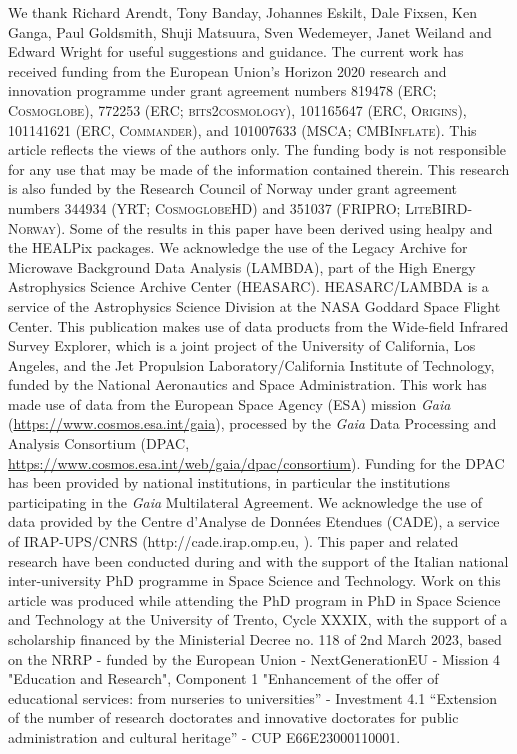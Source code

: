 \documentclass{aa}
\begin{document}
\begin{acknowledgements}
  We thank Richard Arendt, Tony Banday, Johannes Eskilt, Dale Fixsen, Ken Ganga, Paul
  Goldsmith, Shuji Matsuura, Sven Wedemeyer, Janet Weiland and Edward Wright for
  useful suggestions and guidance.  The current work has received
  funding from the European Union’s Horizon 2020 research and
  innovation programme under grant agreement numbers 819478 (ERC;
  \textsc{Cosmoglobe}), 772253 (ERC; \textsc{bits2cosmology}),
  101165647 (ERC, \textsc{Origins}), 101141621 (ERC,
  \textsc{Commander}), and 101007633 (MSCA; \textsc{CMBInflate}).
  This article reflects the views of the authors only. The funding
  body is not responsible for any use that may be made of the
  information contained therein. This research is
  also funded by the Research Council of Norway under grant agreement
  numbers 344934 (YRT; \textsc{CosmoglobeHD}) and 351037 (FRIPRO;
  \textsc{LiteBIRD-Norway}). Some of the results in this paper have been
  derived using healpy \citep{Zonca2019} and the HEALPix
  \citep{healpix} packages.  We acknowledge the use of the Legacy
  Archive for Microwave Background Data Analysis (LAMBDA), part of the
  High Energy Astrophysics Science Archive Center
  (HEASARC). HEASARC/LAMBDA is a service of the Astrophysics Science
  Division at the NASA Goddard Space Flight Center. This publication
  makes use of data products from the Wide-field Infrared Survey
  Explorer, which is a joint project of the University of California,
  Los Angeles, and the Jet Propulsion Laboratory/California Institute
  of Technology, funded by the National Aeronautics and Space
  Administration. This work has made use of data from the European
  Space Agency (ESA) mission {\it Gaia}
  (\url{https://www.cosmos.esa.int/gaia}), processed by the {\it Gaia}
  Data Processing and Analysis Consortium (DPAC,
  \url{https://www.cosmos.esa.int/web/gaia/dpac/consortium}). Funding
  for the DPAC has been provided by national institutions, in
  particular the institutions participating in the {\it Gaia}
  Multilateral Agreement.  We acknowledge the use of data provided by
  the Centre d'Analyse de Données Etendues (CADE), a service of
  IRAP-UPS/CNRS (http://cade.irap.omp.eu, \citealt{paradis:2012}).  
  This paper and related research have been conducted during and with the support of the Italian national inter-university PhD programme in Space Science and Technology. Work on this article was produced while attending the PhD program in PhD in Space Science and Technology at the University of Trento, Cycle XXXIX, with the support of a scholarship financed by the Ministerial Decree no. 118 of 2nd March 2023, based on the NRRP - funded by the European Union - NextGenerationEU - Mission 4 "Education and Research", Component 1 "Enhancement of the offer of educational services: from nurseries to universities” - Investment 4.1 “Extension of the number of research doctorates and innovative doctorates for public administration and cultural heritage” - CUP E66E23000110001.
\end{acknowledgements}


%



\end{document}
